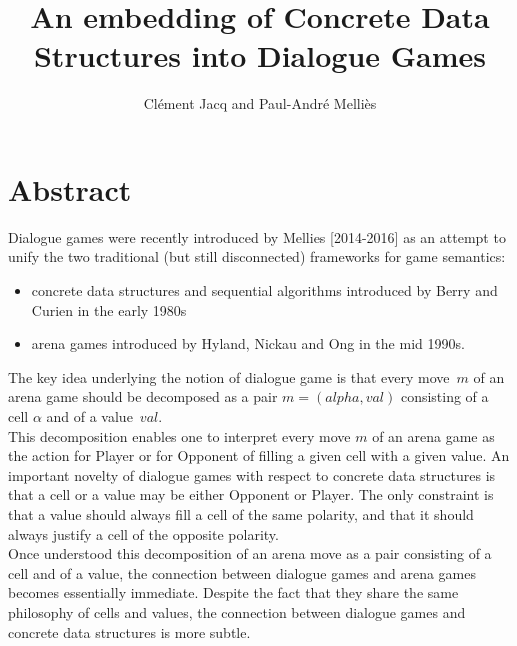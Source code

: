 \documentclass[11pt]{llncs} %
\title{An embedding of Concrete Data Structures into Dialogue Games}
\author{Clément Jacq and Paul-André Melliès\\}
\date{} %
\institute{Laboratoire IRIF, Université Paris Diderot}
\begin{document}
\maketitle
\section*{Abstract}
Dialogue games were recently introduced by Mellies [2014-2016]
as an attempt to unify the two traditional (but still disconnected)
frameworks for game semantics:
\begin{itemize}

\item concrete data structures and sequential algorithms introduced by Berry and Curien in the early 1980s
\item arena games introduced by Hyland, Nickau and Ong in the mid 1990s.
\end{itemize}

The key idea underlying the notion of dialogue game is that every move~$m$ 
of an arena game should be decomposed as a pair $m=(alpha,val)$
consisting of a cell $\alpha$ and of a value~$val$.\\
This decomposition enables one to interpret every move $m$ of an arena game 
as the action for Player or for Opponent of filling a given cell with a given value.
An important novelty of dialogue games with respect to concrete data structures
is that a cell or a value may be either Opponent or Player.
The only constraint is that a value should always fill a cell of the same polarity,
and that it should always justify a cell of the opposite polarity.\\

Once understood this decomposition of an arena move as a pair consisting
of a cell and of a value, the connection between dialogue games and arena games becomes essentially immediate. Despite the fact that they share the same philosophy of cells and values,
the connection between dialogue games and concrete data structures is more subtle. \\
\end{document}
